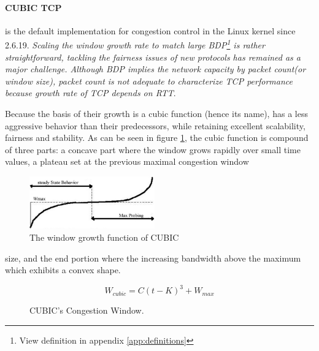 \paragraph{CUBIC TCP}  is the default implementation for congestion control in
the Linux kernel since 2.6.19. \textit{Scaling the window growth rate to match
large BDP\footnote{View definition in appendix \ref{app:definitions}} is rather
straightforward, tackling the fairness issues of new protocols has remained as
a major challenge.  Although BDP implies the network capacity by packet
count(or window size), packet count is not adequate to characterize TCP
performance because growth rate of TCP depends on RTT}\cite{HaCubic}.

Because the basis of their growth is a cubic function (hence its name), has a
less aggressive behavior than their predecessors, while retaining excellent
scalability, fairness and stability. As can be seen in figure
\ref{fig:cubicfunc}, the cubic function is compound of three parts: a concave
part where the window grows rapidly over small time values, a plateau set at the previous maximal
congestion window 

\begin{figure}
\begin{center}
    \includegraphics[width=0.48\textwidth]{img/cubic}
  \end{center}
\caption{The window growth function of CUBIC}
\label{fig:cubicfunc}
\end{figure}

\noindent size, and the end portion where the increasing bandwidth
above the maximum which exhibits a convex shape.

\begin{figure}[h]
\begin{minipage}{6cm}
\centering
	\[ W_{cubic} = C(t - K)^3 + W_{max}\]
    \caption{CUBIC's Congestion Window.\protect\footnotemark}
    \label{fig:cubicform}
\end{minipage}%
\end{figure}%


